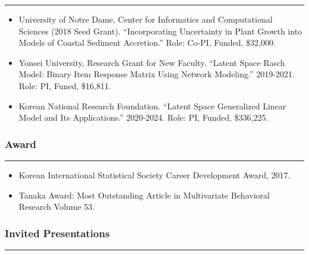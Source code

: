 \documentclass[
]{book}
\providecommand{\tightlist}{%
  \setlength{\itemsep}{0pt}\setlength{\parskip}{0pt}}
\begin{document}
\begin{center}\rule{0.5\linewidth}{0.5pt}\end{center}

\begin{itemize}
\item
  University of Notre Dame, Center for Informatics and Computational Sciences (2018 Seed Grant). ``Incorporating Uncertainty in Plant Growth into Models of Coastal Sediment Accretion.'' Role: Co-PI, Funded, \$32,000.
\item
  Yonsei University, Research Grant for New Faculty. ``Latent Space Rasch Model: Binary Item Response Matrix Using Network Modeling.'' 2019-2021. Role: PI, Funed, \$16,811.
\item
  Korean National Research Foundation. ``Latent Space Generalized Linear Model and Its Applications.'' 2020-2024. Role: PI, Funded, \$336,225.
\end{itemize}

\hypertarget{award}{%
\subsubsection*{Award}\label{award}}

\begin{center}\rule{0.5\linewidth}{0.5pt}\end{center}

\begin{itemize}
\tightlist
\item
  Korean International Statistical Society Career Development Award, 2017.
\item
  Tanaka Award: Most Outstanding Article in Multivariate Behavioral Research Volume 53.
\end{itemize}

\hypertarget{invited-presentations}{%
\subsubsection*{Invited Presentations}\label{invited-presentations}}

\begin{center}\rule{0.5\linewidth}{0.5pt}\end{center}
\end{document}
